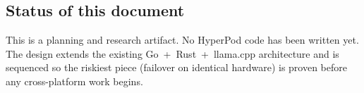 \subsection{Status of this document}
This is a planning and research artifact. No HyperPod code has been written yet.
The design extends the existing Go~+~Rust~+~llama.cpp architecture and is
sequenced so the riskiest piece (failover on identical hardware) is proven before
any cross-platform work begins.
